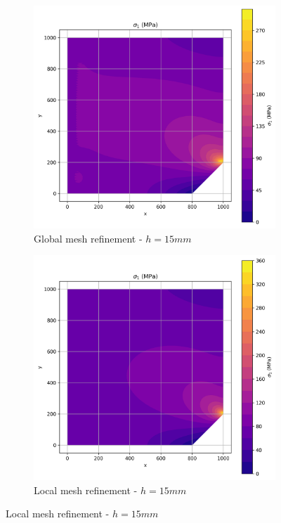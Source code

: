\begin{figure}[H]
  \centering
  \begin{subfigure}[b]{0.45\textwidth}
    \centering
    \includegraphics[width=\textwidth]{GRAFICOS/Quad9/1.75mm_global/resultados - sigma_1.png}
    \caption{Global mesh refinement - $h=15mm$}
    \label{fig:img11}
  \end{subfigure}
  \hfill
  \begin{subfigure}[b]{0.45\textwidth}
    \centering
    \includegraphics[width=\textwidth]{GRAFICOS/Quad9/1.75mm_local/resultados - sigma_1.png}
    \caption{Local mesh refinement - $h=15mm$}
    \label{fig:img21}
  \end{subfigure}
\end{figure}

